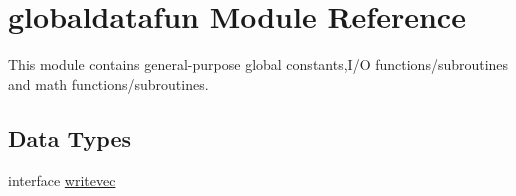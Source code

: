\hypertarget{namespaceglobaldatafun}{}\section{globaldatafun Module Reference}
\label{namespaceglobaldatafun}


This module contains general-\/purpose global constants,I/O functions/subroutines and math functions/subroutines.  


\subsection*{Data Types}
\begin{DoxyCompactItemize}
\item 
interface \hyperlink{interfaceglobaldatafun_1_1writevec}{writevec}
\end{DoxyCompactItemize}
